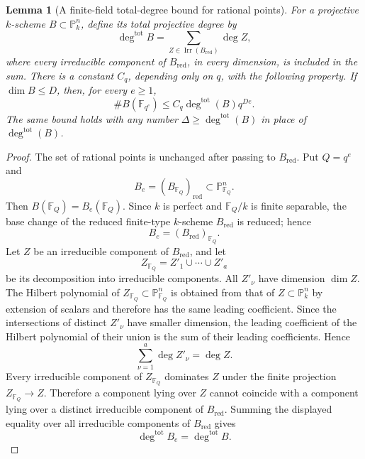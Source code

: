 \documentclass{lms}
\newtheorem{lemma}[theorem]{Lemma}
\newcommand{\F}{\mathbb F}
\newcommand{\PP}{\mathbb P}
\begin{document}
\begin{lemma}[A finite-field total-degree bound for rational points]\label{lem:finite-field-degree-bound}
For a projective $k$-scheme $B\subset\PP^n_k$, define its total projective degree by
\[
        \deg^{\mathrm{tot}} B
        =\sum_{Z\in\operatorname{Irr}(B_{\mathrm{red}})}\deg Z,
\]
where every irreducible component of $B_{\mathrm{red}}$, in every dimension, is included in the sum.  There is a constant $C_q$, depending only on $q$, with the following property.  If $\dim B\le D$, then, for every $e\ge1$,
\[
        \#B(\F_{q^e})\le C_q\deg^{\mathrm{tot}}(B)q^{De}.
\]
The same bound holds with any number $\Delta\ge\deg^{\mathrm{tot}}(B)$ in place of $\deg^{\mathrm{tot}}(B)$.
\end{lemma}

\begin{proof}
The set of rational points is unchanged after passing to $B_{\mathrm{red}}$.  Put $Q=q^e$ and
\[
        B_e=(B_{\F_Q})_{\mathrm{red}}\subset\PP^n_{\F_Q}.
\]
Then $B(\F_Q)=B_e(\F_Q)$.  Since $k$ is perfect and $\F_Q/k$ is finite separable, the base change of the reduced finite-type $k$-scheme $B_{\mathrm{red}}$ is reduced; hence
\[
        B_e=(B_{\mathrm{red}})_{\F_Q}.
\]
Let $Z$ be an irreducible component of $B_{\mathrm{red}}$, and let
\[
        Z_{\F_Q}=Z'_1\cup\cdots\cup Z'_a
\]
be its decomposition into irreducible components.  All $Z'_\nu$ have dimension $\dim Z$.  The Hilbert polynomial of $Z_{\F_Q}\subset\PP^n_{\F_Q}$ is obtained from that of $Z\subset\PP^n_k$ by extension of scalars and therefore has the same leading coefficient.  Since the intersections of distinct $Z'_\nu$ have smaller dimension, the leading coefficient of the Hilbert polynomial of their union is the sum of their leading coefficients.  Hence
\[
        \sum_{\nu=1}^a\deg Z'_\nu=\deg Z.
\]
Every irreducible component of $Z_{\F_Q}$ dominates $Z$ under the finite projection $Z_{\F_Q}\to Z$.  Therefore a component lying over $Z$ cannot coincide with a component lying over a distinct irreducible component of $B_{\mathrm{red}}$.  Summing the displayed equality over all irreducible components of $B_{\mathrm{red}}$ gives
\[
        \deg^{\mathrm{tot}} B_e
        =\deg^{\mathrm{tot}} B.
\]


\end{proof}
\end{document}
